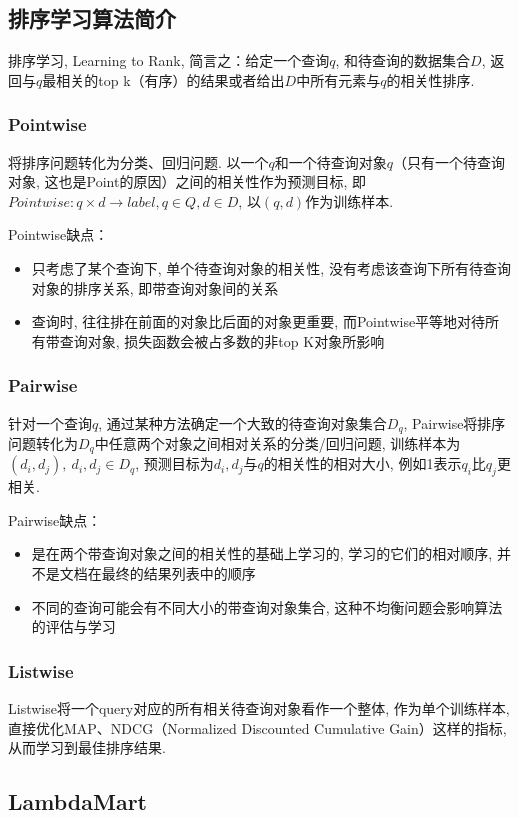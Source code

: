 \subsection{排序学习算法简介}
排序学习, Learning to Rank, 简言之：给定一个查询$q$, 和待查询的数据集合$D$, 返回与$q$最相关的top k（有序）的结果或者给出$D$中所有元素与$q$的相关性排序. 

\subsubsection{Pointwise}
将排序问题转化为分类、回归问题. 以一个$q$和一个待查询对象$q$（只有一个待查询对象, 这也是Point的原因）之间的相关性作为预测目标, 即$Pointwise: q \times d \rightarrow label, q \in Q, d \in D$, 以$(q, d)$作为训练样本. 

Pointwise缺点：
\begin{itemize}
	\item 只考虑了某个查询下, 单个待查询对象的相关性, 没有考虑该查询下所有待查询对象的排序关系, 即带查询对象间的关系
	\item 查询时, 往往排在前面的对象比后面的对象更重要, 而Pointwise平等地对待所有带查询对象, 损失函数会被占多数的非top K对象所影响
\end{itemize}


\subsubsection{Pairwise}
针对一个查询$q$, 通过某种方法确定一个大致的待查询对象集合$D_q$, Pairwise将排序问题转化为$D_q$中任意两个对象之间相对关系的分类/回归问题, 训练样本为$(d_i, d_j),\: d_i, d_j \in D_q$, 预测目标为$d_i, d_j$与$q$的相关性的相对大小, 例如1表示$q_i$比$q_j$更相关. 

Pairwise缺点：
\begin{itemize}
	\item 是在两个带查询对象之间的相关性的基础上学习的, 学习的它们的相对顺序, 并不是文档在最终的结果列表中的顺序
	\item 不同的查询可能会有不同大小的带查询对象集合, 这种不均衡问题会影响算法的评估与学习
\end{itemize}


\subsubsection{Listwise}
Listwise将一个query对应的所有相关待查询对象看作一个整体, 作为单个训练样本, 直接优化MAP、NDCG（Normalized Discounted Cumulative Gain）这样的指标, 从而学习到最佳排序结果. 


\subsection{LambdaMart}
